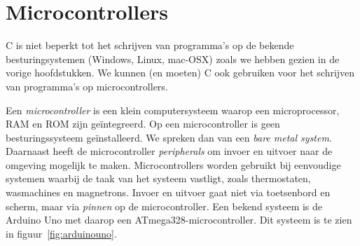 \chapter{Microcontrollers}
\label{cha:microcontrollers}

C is niet beperkt tot het schrijven van programma's op de bekende besturingsystemen (Windows, Linux, mac-OSX) zoals we hebben gezien in de vorige hoofdstukken. We kunnen (en moeten) C ook gebruiken voor het schrijven van programma's op microcontrollers.


Een \textsl{microcontroller} is een klein computersysteem waarop een microprocessor, RAM en ROM zijn ge\"integreerd. Op een microcontroller is geen besturingssysteem ge\"installeerd. We spreken dan van een \textsl{bare metal system}. Daarnaast heeft de microcontroller \textsl{peripherals} om invoer en uitvoer naar de omgeving mogelijk te maken. Microcontrollers worden gebruikt bij eenvoudige systemen waarbij de taak van het systeem vastligt, zoals thermostaten, wasmachines en magnetrons. Invoer en uitvoer gaat niet via toetsenbord en scherm, maar via \textsl{pinnen} op de microcontroller. Een bekend systeem is de Arduino Uno met daarop een ATmega328-microcontroller. Dit systeem is te zien in figuur~\ref{fig:arduinouno}.

